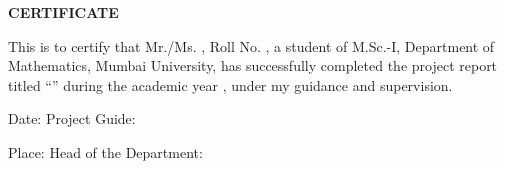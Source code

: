 \documentclass[12pt]{report}
\newcommand{\blank}[1]{\underline{\hspace{#1}}}
\begin{document}
	\thispagestyle{empty}
	\begin{center}
		{\LARGE\bfseries CERTIFICATE}
	\end{center}
	\vspace{1cm}
	
	This is to certify that Mr./Ms. \blank{5cm}, Roll No. \blank{3cm}, a student of M.Sc.-I, Department of Mathematics, Mumbai University, has successfully completed the project report titled ``\blank{7cm}'' during the academic year \blank{3cm}, under my guidance and supervision.
	
	\vspace{3cm}
	\noindent Date: \blank{3cm}\hfill Project Guide: \blank{4cm}
	
	\vspace{1.5cm}
	\noindent Place: \blank{3cm}\hfill Head of the Department: \blank{4cm}
\end{document}
